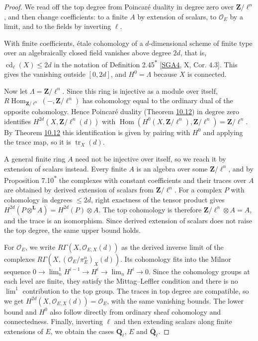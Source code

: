 \documentclass[11pt]{article}
\newcommand{\bpout}[1]{#1\textsuperscript{\hyperlink{bp-outside}{\ensuremath{\ast}}}}
\providecommand{\Hom}{}\renewcommand{\Hom}{\operatorname{Hom}}
\begin{document}
\begin{proof}[{Proof}]\label{bp147}%
We read off the top degree from Poincaré duality in degree zero over \(\mathbf Z/\ell^n\), and then change coefficients: to a finite \(A\) by extension of scalars, to \(\mathcal O_E\) by a limit, and to the fields by inverting \(\ell\).

With finite coefficients, étale cohomology of a \(d\)-dimensional scheme of finite type over an algebraically closed field vanishes above degree \(2d\), that is, \(\operatorname{cd}_\ell(X)\le2d\) in the notation of Definition \bpout{2.45} [\hyperref[bp330]{SGA4}, X, Cor. 4.3]. This gives the vanishing outside \([0,2d]\), and \(H^0=\Lambda\) because \(X\) is connected.

Now let \(\Lambda=\mathbf Z/\ell^n\). Since this ring is injective as a module over itself, \(R\!\operatorname{Hom}_{\mathbf Z/\ell^n}(-,\mathbf Z/\ell^n)\) has cohomology equal to the ordinary dual of the opposite cohomology. Hence Poincaré duality (Theorem \hyperref[bp137]{10.12}) in degree zero identifies \(H^{2d}(X,\mathbf Z/\ell^n(d))\) with \(\Hom(H^0(X,\mathbf Z/\ell^n),\mathbf Z/\ell^n)=\mathbf Z/\ell^n\). By Theorem \hyperref[bp137]{10.12} this identification is given by pairing with \(H^0\) and applying the trace map, so it is \(\operatorname{tr}_X(d)\).

A general finite ring \(A\) need not be injective over itself, so we reach it by extension of scalars instead. Every finite \(A\) is an algebra over some \(\mathbf Z/\ell^n\), and by Proposition \bpout{7.10} the complexes with constant coefficients and their traces over \(A\) are obtained by derived extension of scalars from \(\mathbf Z/\ell^n\). For a complex \(P\) with cohomology in degrees \(\le2d\), right exactness of the tensor product gives \(H^{2d}(P\otimes^{\mathbf L}A)=H^{2d}(P)\otimes A\). The top cohomology is therefore \(\mathbf Z/\ell^n\otimes A=A\), and the trace is an isomorphism. Since derived extension of scalars does not raise the top degree, the same upper bound holds.

For \(\mathcal O_E\), we write \(R\Gamma(X,\mathcal O_{E,X}(d))\) as the derived inverse limit of the complexes \(R\Gamma(X,(\mathcal O_E/\pi_E^n)_X(d))\). Its cohomology fits into the Milnor sequence \(0\to\lim^1_nH^{i-1}\to H^i\to\lim_nH^i\to0\). Since the cohomology groups at each level are finite, they satisfy the Mittag–Leffler condition and there is no \(\lim^1\) contribution to the top group. The traces in top degree are compatible, so we get \(H^{2d}(X,\mathcal O_{E,X}(d))=\mathcal O_E\), with the same vanishing bounds. The lower bound and \(H^0\) also follow directly from ordinary sheaf cohomology and connectedness. Finally, inverting \(\ell\) and then extending scalars along finite extensions of \(E\), we obtain the cases \(\mathbf Q_\ell\), \(E\) and \(\overline{\mathbf Q}_\ell\).
\end{proof}
\end{document}
